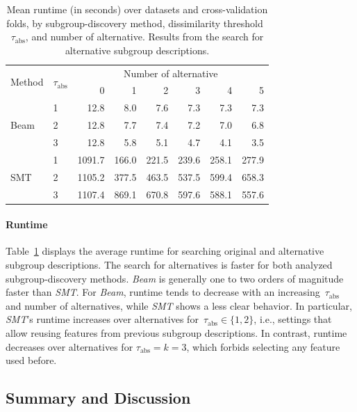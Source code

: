 \documentclass[acmsmall]{acmart} %
\theoremstyle{acmplain}
\theoremstyle{acmdefinition}
\begin{document}
\begin{table}[t]
	\centering
	\caption{
		Mean runtime (in seconds) over datasets and cross-validation folds, by subgroup-discovery method, dissimilarity threshold~$\tau_{\text{abs}}$, and number of alternative.
		Results from the search for alternative subgroup descriptions.
	}
	\begin{tabular}{llrrrrrr}
		\toprule
		\multirow{2}{*}{Method} & \multirow{2}{*}{$\tau_{\text{abs}}$} & \multicolumn{6}{c}{Number of alternative} \\
		\cmidrule(lr){3-8}
		& & 0 & 1 & 2 & 3 & 4 & 5 \\
		\midrule
		\multirow[t]{3}{*}{Beam} & 1 & 12.8 & 8.0 & 7.6 & 7.3 & 7.3 & 7.3 \\
		& 2 & 12.8 & 7.7 & 7.4 & 7.2 & 7.0 & 6.8 \\
		& 3 & 12.8 & 5.8 & 5.1 & 4.7 & 4.1 & 3.5 \\
		\multirow[t]{3}{*}{SMT} & 1 & 1091.7 & 166.0 & 221.5 & 239.6 & 258.1 & 277.9 \\
		& 2 & 1105.2 & 377.5 & 463.5 & 537.5 & 599.4 & 658.3 \\
		& 3 & 1107.4 & 869.1 & 670.8 & 597.6 & 588.1 & 557.6 \\
		\bottomrule
	\end{tabular}
	\label{tab:csd:alteratives-runtime}
\end{table}

\paragraph{Runtime}

Table~\ref{tab:csd:alteratives-runtime} displays the average runtime for searching original and alternative subgroup descriptions.
The search for alternatives is faster for both analyzed subgroup-discovery methods.
\emph{Beam} is generally one to two orders of magnitude faster than \emph{SMT}.
For \emph{Beam}, runtime tends to decrease with an increasing~$\tau_{\text{abs}}$ and number of alternatives, while \emph{SMT} shows a less clear behavior.
In particular, \emph{SMT}'s runtime increases over alternatives for~$\tau_{\text{abs}} \in \{1, 2\}$, i.e., settings that allow reusing features from previous subgroup descriptions.
In contrast, runtime decreases over alternatives for $\tau_{\text{abs}} = k = 3$, which forbids selecting any feature used before.

\subsection{Summary and Discussion}
\label{sec:csd:evaluation:summary-discussion}
\end{document}
